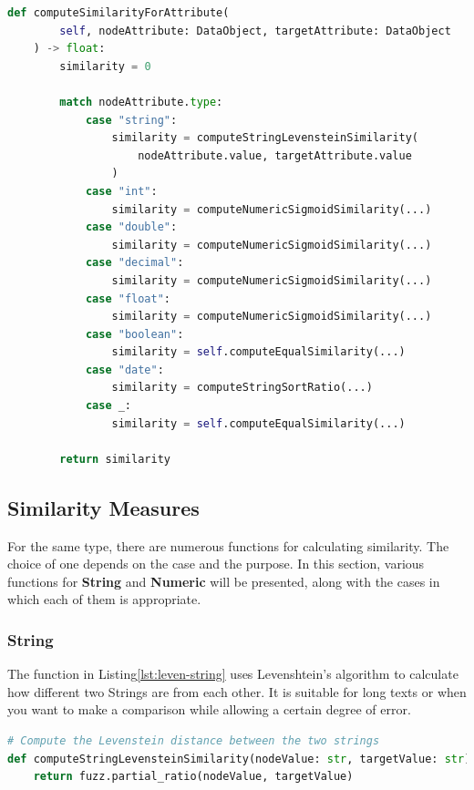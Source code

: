 \begin{lstlisting}[language=Python, caption=Function to compute the similarity value between two attributes, label={lst:comp-sim-att}]
def computeSimilarityForAttribute(
        self, nodeAttribute: DataObject, targetAttribute: DataObject
    ) -> float:
        similarity = 0

        match nodeAttribute.type:
            case "string":
                similarity = computeStringLevensteinSimilarity(
                    nodeAttribute.value, targetAttribute.value
                )
            case "int":
                similarity = computeNumericSigmoidSimilarity(...)
            case "double":
                similarity = computeNumericSigmoidSimilarity(...)
            case "decimal":
                similarity = computeNumericSigmoidSimilarity(...)
            case "float":
                similarity = computeNumericSigmoidSimilarity(...)
            case "boolean":
                similarity = self.computeEqualSimilarity(...)
            case "date":
                similarity = computeStringSortRatio(...)
            case _:
                similarity = self.computeEqualSimilarity(...)

        return similarity
\end{lstlisting}
    

\subsection{Similarity Measures}
For the same type, there are numerous functions for calculating similarity. The choice of one depends on the case and the purpose. In this section, various functions for \textbf{String} and \textbf{Numeric} will be presented, along with the cases in which each of them is appropriate.
    
    \subsubsection{String}
    The function in Listing\ref{lst:leven-string} uses Levenshtein's algorithm to calculate how different two Strings are from each other. It is suitable for long texts or when you want to make a comparison while allowing a certain degree of error.\\
    
\begin{lstlisting}[language=Python, caption=Levenstein distance between two strings, label={lst:leven-string}]
# Compute the Levenstein distance between the two strings
def computeStringLevensteinSimilarity(nodeValue: str, targetValue: str) -> float:
    return fuzz.partial_ratio(nodeValue, targetValue)
\end{lstlisting}
    
